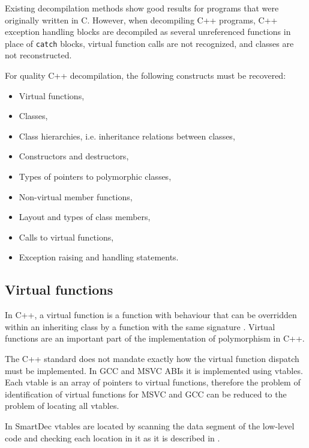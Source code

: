 \documentclass[10pt, conference, compsocconf]{IEEEtran}
\newcommand{\compact}{}
\newcommand{\skipspace}{}
\newcommand{\skipsectionspace}{}
\begin{document}

Existing decompilation methods show good results for programs that 
were originally written in C. 
However, when decompiling C++ programs, 
C++ exception handling blocks are decompiled as several 
unreferenced functions in place of \lstinline{catch} blocks,
virtual function calls are not recognized, and classes 
are not reconstructed.

For quality C++ decompilation, the following constructs must be recovered:
\skipspace\begin{itemize}\compact
\item Virtual functions,
\item Classes,
\item Class hierarchies, i.e. inheritance relations between classes,
\item Constructors and destructors,
\item Types of pointers to polymorphic classes,
\item Non-virtual member functions,
\item Layout and types of class members,
\item Calls to virtual functions,
\item Exception raising and handling statements.
\end{itemize}


\subsection{Virtual functions}\skipsectionspace
In C++, a virtual function is a function with behaviour that can be 
overridden within an inheriting class by a function with the same signature \cite{cpp03}. 
Virtual functions are an important part of the implementation of 
polymorphism in C++.

The C++ standard \cite{cpp03} does not mandate exactly how the 
virtual function dispatch must be implemented. 
In GCC \cite{gccabi} and MSVC \cite{gray94} ABIs it is
implemented using vtables. Each vtable is an 
array of pointers to virtual functions, therefore the problem of 
identification of virtual functions for MSVC and GCC can be 
reduced to the problem of locating all vtables.

In SmartDec vtables are located by scanning the data segment of the 
low-level code and checking each location in it as it is described in \cite{fokin10}. 
\end{document}
